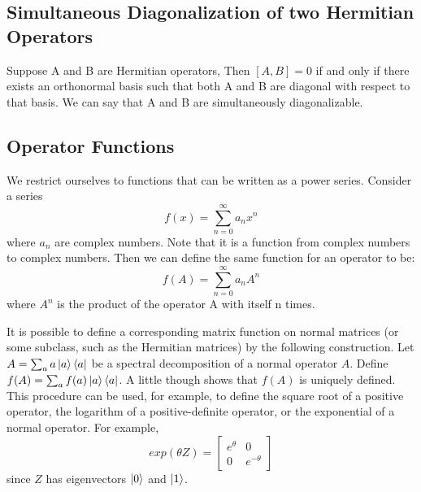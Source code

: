 \subsection{Simultaneous Diagonalization of two Hermitian Operators}
\begin{definition}
    Suppose A and B are Hermitian operators, Then $[A,B]=0$ if and only if there exists an orthonormal basis
    such that both A and B are diagonal with respect to that basis. We can say that A and B are simultaneously diagonalizable.    
\end{definition}

\subsection{Operator Functions}
We restrict ourselves to functions that can be written as a power series. Consider a series
\[ f(x)=\sum_{n=0}^{\infty} a_nx^n \]
where $a_n$ are complex numbers. Note that it is a function from complex numbers to complex numbers. Then we can define the same function for an operator to be:
\[ f(A)=\sum_{n=0}^{\infty} a_nA^n \]
where $A^n$ is the product of the operator A with itself n times. 

It is possible to define a corresponding matrix function on normal matrices (or some subclass, such as the Hermitian matrices) by the following construction. Let $A=\sum_a a\ket{a}\bra{a}$ be a spectral decomposition of a normal operator $A$. Define $f(A)=\sum_a f(a)\ket{a}\bra{a}$. A little though shows that $f(A)$ is uniquely defined. This procedure can be used, for example, to define the square root of a positive operator, the logarithm of a positive-definite operator, or the exponential of a normal operator. For example,
\[
exp(\theta Z)=\begin{bmatrix} e^{\theta} & 0 \\ 0 & e^{-\theta} \end{bmatrix}
\]
since $Z$ has eigenvectors $\ket{0}$ and $\ket{1}$.

